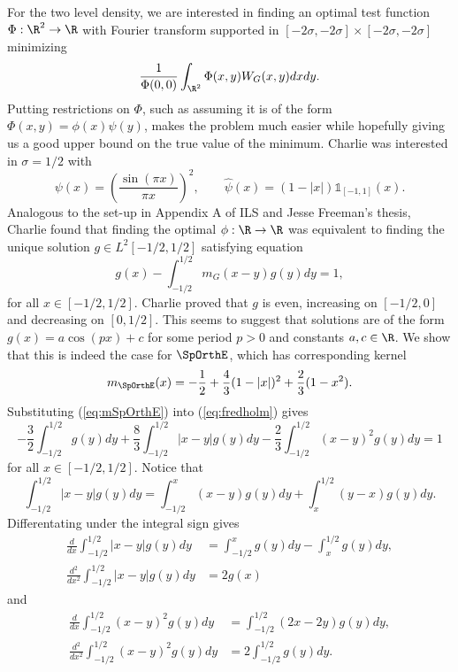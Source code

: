 For the two level density, we are interested in finding an optimal test function $\Phi : \R^2 \to \R$ with Fourier transform supported in $[-2\sigma, -2\sigma] \times [-2\sigma, -2\sigma]$ minimizing 
	\[ \frac{1}{\Phi(0, 0)} \int_{\R^2} \Phi(x, y) W_G (x, y) dx dy.  \]
Putting restrictions on $\Phi$, such as assuming it is of the form $\Phi(x, y) = \phi(x) \psi (y)$, makes the problem much easier while hopefully giving us a good upper bound on the true value of the minimum. Charlie was interested in $\sigma = 1/2$ with 
	\[\psi (x) = \left(\frac{\sin(\pi x)}{\pi x}\right)^2, \qquad \widehat \psi (x) = (1 - |x|) \mathbb 1_{[-1, 1]} (x). \] 
Analogous to the set-up in Appendix A of ILS and Jesse Freeman's thesis, Charlie found that finding the optimal $\phi: \R \to \R$ was equivalent to finding the unique solution $g \in L^2 [-1/2, 1/2]$ satisfying equation
\begin{equation}
	g(x) - \int_{-1/2}^{1/2} m_G (x - y) g(y) dy = 1,		\label{eq:fredholm}
\end{equation}
for all $x \in [-1/2, 1/2]$. Charlie proved that $g$ is even, increasing on $[-1/2, 0]$ and decreasing on $[0, 1/2]$. This seems to suggest that solutions are of the form $g (x) = a \cos (p x) + c$ for some period $p > 0$ and constants $a, c \in \R$. We show that this is indeed the case for $\SpOrthE$, which has corresponding kernel
\begin{equation}
	m_{\SpOrthE} (x) = -\frac12 + \frac43 (1 - |x|)^2 + \frac23 (1 - x^2).	\label{eq:mSpOrthE}
\end{equation}
Substituting (\ref{eq:mSpOrthE}) into (\ref{eq:fredholm}) gives
\[
	- \frac32 \int_{-1/2}^{1/2} g(y) dy + \frac83  \int_{-1/2}^{1/2} |x - y| g(y)dy - \frac23  \int_{-1/2}^{1/2} (x - y)^2 g(y) dy = 1
\]
for all $x \in [-1/2, 1/2]$. Notice that 
	\[  \int_{-1/2}^{1/2} |x - y| g(y) dy = \int_{-1/2}^x (x - y) g(y) dy + \int_x^{1/2} (y - x) g(y) dy. \]
Differentating under the integral sign gives	
\begin{align*}
	\frac{d}{dx}  \int_{-1/2}^{1/2} |x - y| g(y) dy 
		&= \int_{-1/2}^x g(y) dy - \int_x^{1/2} g(y) dy, \\
	\frac{d^2}{dx^2}  \int_{-1/2}^{1/2} |x - y| g(y) dy 
		&= 2g(x)		
\end{align*}
and
\begin{align*}
	\frac{d}{dx} \int_{-1/2}^{1/2} (x - y)^2 g(y) dy
		&= \int_{-1/2}^{1/2} (2x - 2y) g(y) dy, \\
	\frac{d^2}{dx^2} \int_{-1/2}^{1/2} (x - y)^2 g(y) dy
		&= 2 \int_{-1/2}^{1/2} g(y) dy.
\end{align*}
